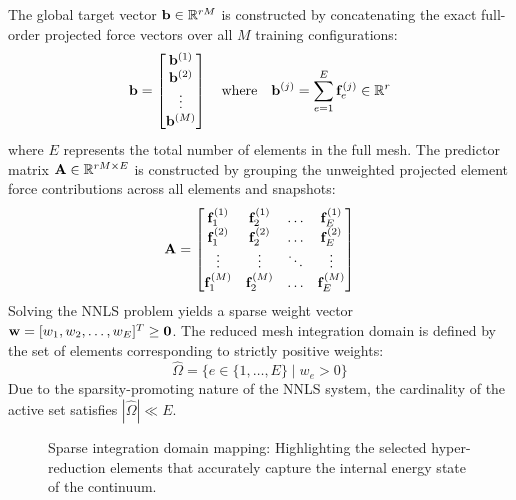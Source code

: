The global target vector $\mathbf{b} \in \mathbb{R}^{rM}$ is constructed by concatenating the exact full-order projected force vectors over all $M$ training configurations:
\begin{equation}
        \mathbf{b} = \begin{bmatrix} \mathbf{b}^{(1)} \\ \mathbf{b}^{(2)} \\ \vdots \\ \mathbf{b}^{(M)} \end{bmatrix} \quad \text{where} \quad \mathbf{b}^{(j)} = \sum_{e=1}^E \mathbf{f}_e^{(j)} \in \mathbb{R}^r
\end{equation}
where $E$ represents the total number of elements in the full mesh. The predictor matrix $\mathbf{A} \in \mathbb{R}^{rM \times E}$ is constructed by grouping the unweighted projected element force contributions across all elements and snapshots:
\begin{equation}
        \mathbf{A} = \begin{bmatrix}
                \mathbf{f}_1^{(1)} & \mathbf{f}_2^{(1)} & \dots & \mathbf{f}_E^{(1)} \\
                \mathbf{f}_1^{(2)} & \mathbf{f}_2^{(2)} & \dots & \mathbf{f}_E^{(2)} \\
                \vdots & \vdots & \ddots & \vdots \\
                \mathbf{f}_1^{(M)} & \mathbf{f}_2^{(M)} & \dots & \mathbf{f}_E^{(M)}
        \end{bmatrix}
\end{equation}
Solving the NNLS problem yields a sparse weight vector $\mathbf{w} = [w_1, w_2, \dots, w_E]^T \ge \mathbf{0}$. The reduced mesh integration domain is defined by the set of elements corresponding to strictly positive weights:
\begin{equation}
        \widehat{\Omega} = \{ e \in \{1, \dots, E\} \mid w_e > 0 \}
\end{equation}
Due to the sparsity-promoting nature of the NNLS system, the cardinality of the active set satisfies $|\widehat{\Omega}| \ll E$.

\begin{figure}[H]
    \centering
    \vspace{4cm}
    \caption{Sparse integration domain mapping: Highlighting the selected hyper-reduction elements that accurately capture the internal energy state of the continuum.}
    \label{fig:ecsw_mesh_selection}
\end{figure}

